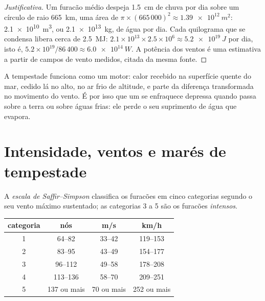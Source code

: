 \begin{proof}[Justificativa]
Um furacão médio despeja \qty{1.5}{cm} de chuva por dia sobre um círculo de
raio \qty{665}{km}, uma área de $\pi \times (665\,000)^2 \approx
\qty{1.39e12}{m^2}$: \qty{2.1e10}{m^3}, ou \qty{2.1e13}{kg}, de água por
dia. Cada quilograma que se condensa libera cerca de \qty{2.5}{MJ}:
$2.1\times10^{13}
\times 2.5\times10^6 \approx \qty{5.2e19}{J}$ por dia, isto é,
$5.2\times10^{19}/86\,400 \approx \qty{6.0e14}{W}$. A potência dos ventos é
uma estimativa a partir de campos de vento medidos, citada da mesma fonte.
\end{proof}

A tempestade funciona como um motor: calor recebido na superfície quente do
mar, cedido lá no alto, no ar frio de altitude, e parte da diferença
transformada no movimento do vento. É por isso que um  se
enfraquece depressa quando passa sobre a terra ou sobre águas frias: ele
perde o seu suprimento de água que evapora.

\section{Intensidade, ventos e marés de tempestade}

\begin{definition}\label{def:g10:storms-and-cyclones:scale}
A \emph{escala de Saffir--Simpson}
classifica os furacões em cinco categorias segundo o seu vento máximo
sustentado; as categorias 3 a 5 são os furacões \emph{intensos}.
\end{definition}

\begin{center}
\small
\begin{tabular}{cccc}
\hline
categoria & nós & \unit{m/s} & \unit{km/h} \\
\hline
1 & 64--82 & 33--42 & 119--153 \\
2 & 83--95 & 43--49 & 154--177 \\
3 & 96--112 & 49--58 & 178--208 \\
4 & 113--136 & 58--70 & 209--251 \\
5 & 137 ou mais & 70 ou mais & 252 ou mais \\
\hline
\end{tabular}
\end{center}

